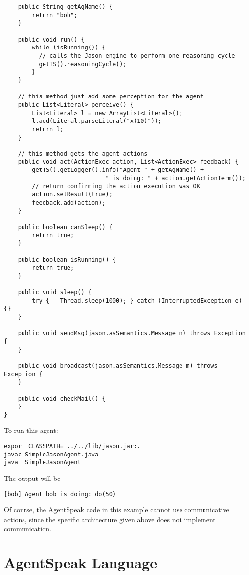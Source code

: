 \documentclass{article}
\begin{document}
\begin{description}
\begin{verbatim}
    public String getAgName() {
        return "bob";
    }

    public void run() {
        while (isRunning()) {
          // calls the Jason engine to perform one reasoning cycle
          getTS().reasoningCycle();
        }
    }

    // this method just add some perception for the agent
    public List<Literal> perceive() {
        List<Literal> l = new ArrayList<Literal>();
        l.add(Literal.parseLiteral("x(10)"));
        return l;
    }

    // this method gets the agent actions
    public void act(ActionExec action, List<ActionExec> feedback) {
        getTS().getLogger().info("Agent " + getAgName() + 
                             " is doing: " + action.getActionTerm());
        // return confirming the action execution was OK
        action.setResult(true);
        feedback.add(action);
    }

    public boolean canSleep() {
        return true;
    }

    public boolean isRunning() {
        return true;
    }

    public void sleep() {
    	try {   Thread.sleep(1000); } catch (InterruptedException e) {}
    }
    
    public void sendMsg(jason.asSemantics.Message m) throws Exception {
    }

    public void broadcast(jason.asSemantics.Message m) throws Exception {
    }

    public void checkMail() {
    }
}
\end{verbatim}

To run this agent:
\begin{verbatim}
export CLASSPATH= ../../lib/jason.jar:.
javac SimpleJasonAgent.java
java  SimpleJasonAgent
\end{verbatim}

The output will be 
\begin{verbatim}
[bob] Agent bob is doing: do(50)
\end{verbatim}

Of course, the AgentSpeak code in this example cannot use communicative
actions, since the specific architecture given above does not implement
communication.

\section{AgentSpeak Language}


\end{description}
\end{document}
